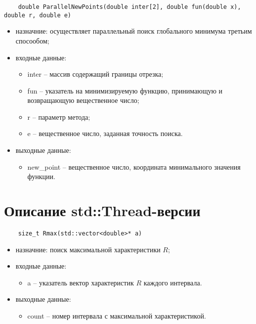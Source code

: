 \documentclass{report}
\begin{document}
\begin{lstlisting}
    double ParallelNewPoints(double inter[2], double fun(double x), double r, double e)
\end{lstlisting}
\begin{itemize}
    \item назначние: осуществляет параллельный поиск глобального минимума третьим спосообом;
    \item входные данные:
        \begin{itemize}	
            \item inter – массив содержащий границы отрезка;
            \item fun – указатель на минимизируемую функцию, принимающую и возвращающую вещественное число;
            \item r – параметр метода;
            \item e – вещественное число, заданная точность поиска.
        \end{itemize}
    \item выходные данные:
        \begin{itemize}
            \item new\_point – вещественное число, координата минимального значения функции.
        \end{itemize}
\end{itemize}


\section{Описание std::Thread-версии}
\begin{lstlisting}
    size_t Rmax(std::vector<double>* a) 
\end{lstlisting}
\begin{itemize}
    \item назначние: поиск максимальной характеристики $R$;
    \item входные данные:
        \begin{itemize}	
            \item a – указатель вектор характеристик $R$ каждого интервала.
        \end{itemize}
    \item выходные данные:
        \begin{itemize}
        	\item count – номер интервала с максимальной характеристикой.
        \end{itemize}
\end{itemize}
\end{document}
